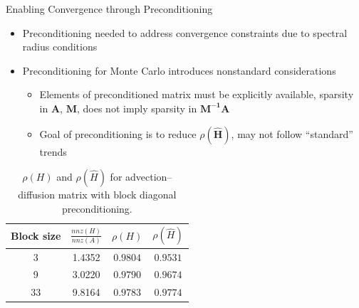 \documentclass{beamer}
\begin{document}
\begin{frame}{Enabling Convergence through Preconditioning}
  \begin{itemize}
    \item Preconditioning needed to address convergence constraints due to
      spectral radius conditions
    \item Preconditioning for Monte Carlo introduces nonstandard considerations
      \begin{itemize}
      \item Elements of preconditioned matrix must be explicitly available,
        sparsity in $\mathbf{A}$, $\mathbf{M}$, does not imply sparsity in
        $\mathbf{M^{-1}A}$
        \item Goal of preconditioning is to reduce $\rho(\hat{\mathbf{H}})$,
          may not follow ``standard'' trends
      \end{itemize}
  \end{itemize}
  \vfill

  \begin{table}[!h]
  \centering
  \begin{tabular}{|c|c|c|c|}
  \hline
  \textbf{Block size} & \textbf{$\frac{nnz(H)}{nnz(A)}$}& $\rho(H)$
  &$\rho(\hat{H})$\\
  \hline
   3 & 1.4352 & $0.9804$ & $0.9531$\\
  \hline
   9 & 3.0220 & $0.9790$ & $0.9674$\\
  \hline
   33 & 9.8164 & $0.9783$  & $0.9774$\\
  \hline
  \end{tabular}
  \caption{$\rho(H)$ and $\rho(\hat{H})$ for advection--diffusion
  matrix with block diagonal preconditioning.}
  \label{tab:ifiss_block}
  \end{table}
\end{frame}

\end{document}
